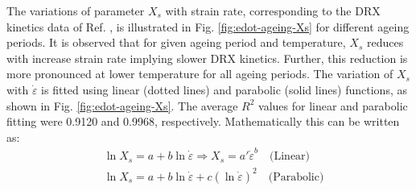\documentclass[a4paper, 11pt, dvipsnames]{article}
\begin{document}
The variations of parameter $X_s$ with strain rate, corresponding to the DRX kinetics data of Ref. \cite{X1}, is illustrated in Fig. \ref{fig:edot-ageing-Xs} for different ageing periods. It is observed that for given ageing period and temperature, $X_s$ reduces with increase strain rate implying slower DRX kinetics. Further, this reduction is more pronounced at lower temperature for all ageing periods. The variation of $X_s$ with $\dot{\varepsilon}$ is fitted using linear (dotted lines) and parabolic (solid lines) functions, as shown in Fig. \ref{fig:edot-ageing-Xs}. The average $R^2$ values for linear and parabolic fitting were 0.9120 and 0.9968, respectively. Mathematically this can be written as:
\begin{equation}
\begin{aligned}
& \ln X_s = a + b\ln\dot{\varepsilon} \Rightarrow X_s = a'\dot{\varepsilon}^{b}\quad \text{(Linear)} \\
& \ln X_s = a + b\ln\dot{\varepsilon} + c\left(\ln\dot{\varepsilon}\right)^2\quad \text{(Parabolic)}
\end{aligned}
\end{equation}
\end{document}
